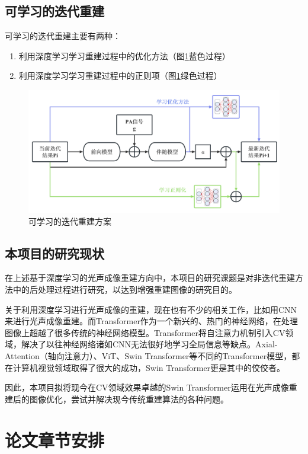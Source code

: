 \subsection{可学习的迭代重建}
可学习的迭代重建主要有两种：

\begin{enumerate}
	\item 利用深度学习学习重建过程中的优化方法（图\ref{img105}蓝色过程）
	\item 利用深度学习学习重建过程中的正则项（图\ref{img105}绿色过程）
\end{enumerate}

\begin{figure}[h]
	\centering
	\includegraphics[width=0.9\columnwidth]{image/chap01/img_1_05.png}
	\caption{可学习的迭代重建方案}
	\label{img105}
\end{figure}

\subsection{本项目的研究现状}
在上述基于深度学习的光声成像重建方向中，本项目的研究课题是对非迭代重建方法中的后处理过程进行研究，以达到增强重建图像的研究目的。
   
关于利用深度学习进行光声成像的重建，现在也有不少的相关工作，比如用CNN来进行光声成像重建。而Transformer作为一个新兴的、热门的神经网络，在处理图像上超越了很多传统的神经网络模型。Transformer将自注意力机制引入CV领域，解决了以往神经网络诸如CNN无法很好地学习全局信息等缺点。Axial-Attention（轴向注意力）、ViT、Swin Transformer等不同的Transformer模型，都在计算机视觉领域取得了很大的成功，Swin Transformer更是其中的佼佼者。

因此，本项目拟将现今在CV领域效果卓越的Swin Transformer运用在光声成像重建后的图像优化，尝试并解决现今传统重建算法的各种问题。


\section{论文章节安排}

